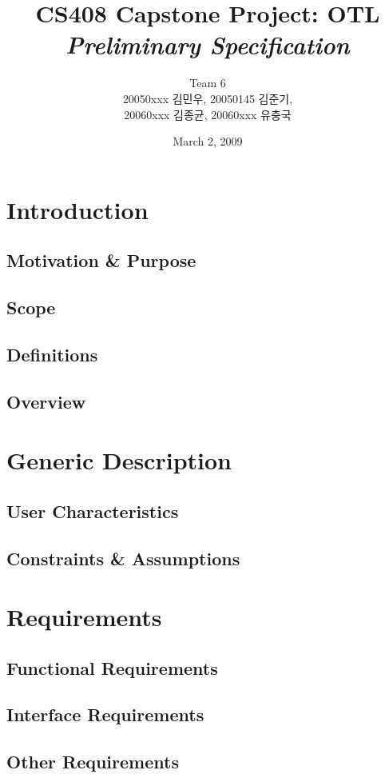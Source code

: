 \documentclass[a4paper,titlepage]{article}
\title{\textbf{CS408 Capstone Project: OTL} \textit{Preliminary Specification}}
\author{Team 6\\20050xxx 김민우, 20050145 김준기,\\20060xxx 김종균, 20060xxx 유충국}
\begin{document}
\date{March 2, 2009}
\maketitle
{}
\tableofcontents
\listoffigures

\pagebreak

\section{Introduction}
\subsection{Motivation \& Purpose}
\subsection{Scope}
\subsection{Definitions}
\subsection{Overview}

\section{Generic Description}
\subsection{User Characteristics}
\subsection{Constraints \& Assumptions}

\section{Requirements}
\subsection{Functional Requirements}
\subsection{Interface Requirements}
\subsection{Other Requirements}
\end{document}
